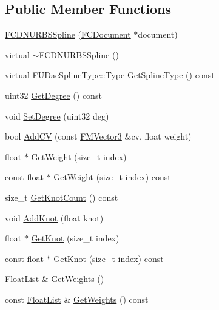 \subsection*{Public Member Functions}
\begin{DoxyCompactItemize}
\item 
\hyperlink{classFCDNURBSSpline_afa75b1dac57825795ed7d93d9994140b}{FCDNURBSSpline} (\hyperlink{classFCDocument}{FCDocument} $\ast$document)
\item 
virtual \hyperlink{classFCDNURBSSpline_a5315520e4fe1b49b422c83270a0a7d9b}{$\sim$FCDNURBSSpline} ()
\item 
virtual \hyperlink{namespaceFUDaeSplineType_a7db2b90bcd53814239cc29f64754d0ab}{FUDaeSplineType::Type} \hyperlink{classFCDNURBSSpline_a0d9cface270d668744063df438332592}{GetSplineType} () const 
\item 
uint32 \hyperlink{classFCDNURBSSpline_a6396ce1363effd9c57e88f5eda7c3869}{GetDegree} () const 
\item 
void \hyperlink{classFCDNURBSSpline_a093e97e94918de75a5854ac1d30201ce}{SetDegree} (uint32 deg)
\item 
bool \hyperlink{classFCDNURBSSpline_a76afdd5aba03ec465efe32c963e0bd8d}{AddCV} (const \hyperlink{classFMVector3}{FMVector3} \&cv, float weight)
\item 
float $\ast$ \hyperlink{classFCDNURBSSpline_a7d362b126d164738ee5b8d344d9ffa29}{GetWeight} (size\_\-t index)
\item 
const float $\ast$ \hyperlink{classFCDNURBSSpline_ae209c1bfe8b9804851c614f1b0631959}{GetWeight} (size\_\-t index) const 
\item 
size\_\-t \hyperlink{classFCDNURBSSpline_a75f39839a5054b7e2aeccbd63ad85d47}{GetKnotCount} () const 
\item 
void \hyperlink{classFCDNURBSSpline_aa7d6b4c46691ad6aab4b8fc8922ebbad}{AddKnot} (float knot)
\item 
float $\ast$ \hyperlink{classFCDNURBSSpline_aebe963a1b4311daea601fba391415706}{GetKnot} (size\_\-t index)
\item 
const float $\ast$ \hyperlink{classFCDNURBSSpline_a0391ad1bea1a2baa08febd7b28ba272c}{GetKnot} (size\_\-t index) const 
\item 
\hyperlink{classfm_1_1vector}{FloatList} \& \hyperlink{classFCDNURBSSpline_adc5904c97454117c01174f07d361ae8a}{GetWeights} ()
\item 
const \hyperlink{classfm_1_1vector}{FloatList} \& \hyperlink{classFCDNURBSSpline_a6df8aaa179b35cdb639b4f19b696a6d7}{GetWeights} () const 
\item 

\end{DoxyCompactItemize}
